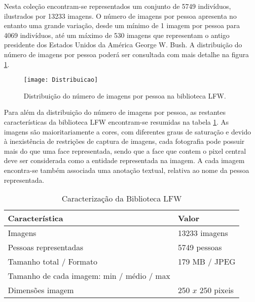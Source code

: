 Nesta coleção encontram-se representados um conjunto de 5749 indivíduos, ilustrados por 13233 imagens. O número de imagens por pessoa apresenta no entanto uma grande variação, desde um mínimo de 1 imagem por pessoa para 4069 indivíduos, até um máximo de 530 imagens que representam o antigo presidente dos Estados Unidos da América George W. Bush. A distribuição do número de imagens por pessoa poderá ser consultada com mais detalhe na figura \ref{fig:distribuicaoLFW}.

\begin{figure}[ht]
  \begin{center}
    \leavevmode
    \texttt{[image: Distribuicao]}
    \caption{Distribuição do número de imagens por pessoa na biblioteca LFW.}
    \label{fig:distribuicaoLFW}
  \end{center}
\end{figure}

Para além da distribuição do número de imagens por pessoa, as restantes características da biblioteca LFW encontram-se resumidas na tabela \ref{tab:lfw}. As imagens são maioritariamente a cores, com diferentes graus de saturação e devido à inexistência de restrições de captura de imagens, cada fotografia pode possuir mais do que uma face representada, sendo que a face que contem o pixel central deve ser considerada como a entidade representada na imagem. A cada imagem encontra-se também associada uma anotação textual, relativa ao nome da pessoa representada. 
\begin{center}
\begin{table}
	\caption{Caracterização da Biblioteca LFW}
	\begin{center}
    \begin{tabular}{ll}
    \hline
    Característica                            & Valor            \\ \hline
    Imagens                                   & 13233 imagens    \\
    Pessoas representadas                     & 5749 pessoas     \\
    Tamanho total / Formato                   & 179 MB / JPEG    \\
    Tamanho de cada imagem: min / médio / max & ~                \\
    Dimensões imagem                          & 250 $x$ 250 pixeis \\
    \hline
    \end{tabular}
	\label{tab:lfw}
	\end{center}
\end{table}
\end{center}

